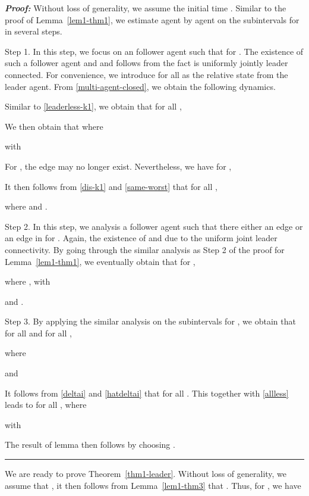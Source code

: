 \documentclass[a4paper, 11pt]{article}
\newenvironment{IEEEproof}[1][\bf Proof]{\smallskip\par\noindent\textit{#1: }}{\hspace*{\fill} \rule{6pt}{6pt}\smallskip}
\begin{document}
\begin{IEEEproof}
Without loss of generality, we assume the initial time .
Similar to the proof of Lemma~\ref{lem1-thm1}, we estimate  agent by agent on the subintervals  for  in several steps.

\noindent Step 1. In this step, we focus on an follower agent  such that
 for .
The existence of such a follower agent  and  and follows from the fact
 is uniformly jointly leader connected. 
For convenience, we introduce  for all  as the relative state from the leader agent.
From \eqref{multi-agent-closed}, we obtain the following dynamics.


Similar to \eqref{leaderless-k1}, we obtain that for all ,

We then obtain that 
where

with

For , the edge  may no longer exist.
Nevertheless, we have for ,

It then follows from \eqref{dis-k1} and \eqref{same-worst} that
for all ,

where  and
.

\vspace*{2mm}

\noindent Step 2. In this step, we analysis a follower agent  such that
there either an edge  or an edge  in  for . Again, the existence of  and  due to the uniform joint leader connectivity.
By going through the similar analysis as Step 2 of the proof for Lemma~\ref{lem1-thm1}, we eventually obtain
that for ,

where ,
with

and .

\vspace*{2mm}

\noindent Step 3. By applying the similar analysis on the subintervals  for ,
we obtain that for all  and for all ,

where

and

It follows from \eqref{deltai} and \eqref{hatdeltai} that  for all .
This together with \eqref{allless} leads to
 for all , where

with

The result of lemma then follows by choosing .
\end{IEEEproof}

We are ready to prove Theorem~\ref{thm1-leader}. Without loss of generality, we assume that , it then follows from Lemma~\ref{lem1-thm3} that . Thus, for , we have
\end{document}
